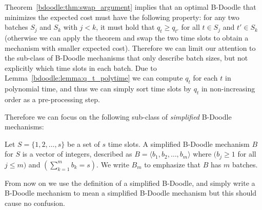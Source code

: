 Theorem~\ref{bdoodle:thm:swap_argument} implies that an optimal B-Doodle that minimizes the expected cost must have the following property: for any two batches $S_j$ and $S_k$ with $j < k$, it must hold that $q_t \geq q_{t'}$ for all $t\in S_j$ and $t' \in S_k$ (otherwise we can apply the theorem and swap the two time slots to obtain a mechanism with smaller expected cost).
Therefore we can limit our attention to the sub-class of B-Doodle mechanisms that only describe batch sizes, but not explicitly which time slots in each batch. Due to Lemma~\ref{bdoodle:lemma:q_t_polytime} we can compute $q_t$ for each $t$ in polynomial time, and thus we can simply sort time slots by $q_t$ in non-increasing order as a pre-processing step.

Therefore we can focus on the following sub-class of \emph{simplified} B-Doodle mechanisms:
\begin{definition}
Let $S = \{1, 2, \dots, s\}$ be a set of $s$ time slots. 
A simplified B-Doodle mechanism $B$ for $S$ is a vector of integers, described as $B = \langle b_1, b_2, \dots, b_m\rangle$ where $(b_j \geq 1$ for all $j \leq m)$ and $(\sum_{k=1}^{m} b_k = s)$.
We write $B_m$ to emphasize that $B$ has $m$ batches.
\end{definition}
From now on we use the definition of a simplified B-Doodle, and simply write a B-Doodle mechanism to mean a simplified B-Doodle mechanism but this should cause no confusion.












